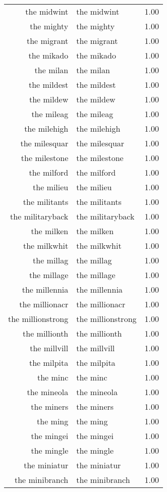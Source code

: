 \begin{table}[ht]
\begin{tabular}{rlr}
  the midwint & the midwint & 1.00 \\ 
  the mighty & the mighty & 1.00 \\ 
  the migrant & the migrant & 1.00 \\ 
  the mikado & the mikado & 1.00 \\ 
  the milan & the milan & 1.00 \\ 
  the mildest & the mildest & 1.00 \\ 
  the mildew & the mildew & 1.00 \\ 
  the mileag & the mileag & 1.00 \\ 
  the milehigh & the milehigh & 1.00 \\ 
  the milesquar & the milesquar & 1.00 \\ 
  the milestone & the milestone & 1.00 \\ 
  the milford & the milford & 1.00 \\ 
  the milieu & the milieu & 1.00 \\ 
  the militants & the militants & 1.00 \\ 
  the militaryback & the militaryback & 1.00 \\ 
  the milken & the milken & 1.00 \\ 
  the milkwhit & the milkwhit & 1.00 \\ 
  the millag & the millag & 1.00 \\ 
  the millage & the millage & 1.00 \\ 
  the millennia & the millennia & 1.00 \\ 
  the millionacr & the millionacr & 1.00 \\ 
  the millionstrong & the millionstrong & 1.00 \\ 
  the millionth & the millionth & 1.00 \\ 
  the millvill & the millvill & 1.00 \\ 
  the milpita & the milpita & 1.00 \\ 
  the minc & the minc & 1.00 \\ 
  the mineola & the mineola & 1.00 \\ 
  the miners & the miners & 1.00 \\ 
  the ming & the ming & 1.00 \\ 
  the mingei & the mingei & 1.00 \\ 
  the mingle & the mingle & 1.00 \\ 
  the miniatur & the miniatur & 1.00 \\ 
  the minibranch & the minibranch & 1.00 \\ 

\end{tabular}
\end{table}
